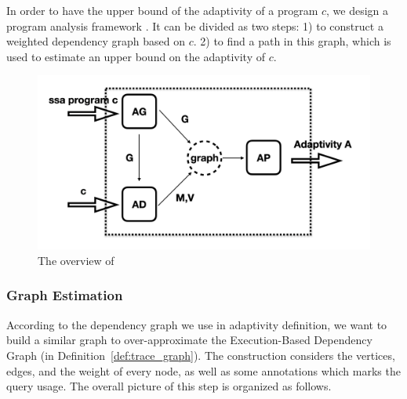 In order to have the upper bound of the  adaptivity of a program $c$, we design a program analysis framework {\THESYSTEM}. It can be divided as two steps: 1) to construct a weighted dependency graph based on $c$. 2) to find a path in this graph, which is used to estimate an upper bound on the adaptivity of $c$.
\begin{figure}
  \centering    
\includegraphics[width=1.0\columnwidth]{adapfun.png}
  \vspace{-0.3cm}
  \caption{The overview of {\THESYSTEM}}
  \label{fig:adaptfun}
  \vspace{-0.5cm}
\end{figure}
\subsubsection{Graph Estimation}
%
%
According to the dependency graph we use in adaptivity definition, we want to build a similar graph to {over-}approximate the
Execution-Based Dependency Graph (in Definition~\ref{def:trace_graph}). The construction considers the vertices, edges, and the weight of every node, as well as some annotations which marks the query usage. The overall picture of this step is organized as follows.


